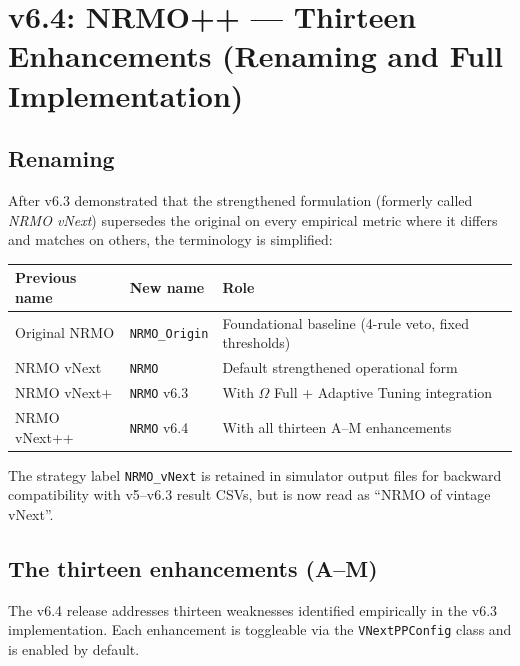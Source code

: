 \section{v6.4: NRMO++ — Thirteen Enhancements (Renaming and Full Implementation)}
\label{sec:nrmo-pp-v64}

\subsection{Renaming}
\label{sec:renaming-v64}

After v6.3 demonstrated that the strengthened formulation (formerly
called \emph{NRMO vNext}) supersedes the original on every empirical
metric where it differs and matches on others, the terminology is
simplified:

\begin{center}
\begin{tabular}{lll}
\toprule
Previous name & New name & Role \\
\midrule
Original NRMO  & \texttt{NRMO\_Origin} & Foundational baseline (4-rule veto, fixed thresholds) \\
NRMO vNext     & \texttt{NRMO}         & Default strengthened operational form \\
NRMO vNext+    & \texttt{NRMO} v6.3    & With $\Omega$ Full + Adaptive Tuning integration \\
NRMO vNext++   & \texttt{NRMO} v6.4    & With all thirteen A--M enhancements \\
\bottomrule
\end{tabular}
\end{center}

The strategy label \texttt{NRMO\_vNext} is retained in simulator output
files for backward compatibility with v5--v6.3 result CSVs, but is now
read as ``NRMO of vintage vNext''.

\subsection{The thirteen enhancements (A--M)}
\label{sec:enhancements-a-m}

The v6.4 release addresses thirteen weaknesses identified empirically
in the v6.3 implementation. Each enhancement is toggleable via the
\texttt{VNextPPConfig} class and is enabled by default.

